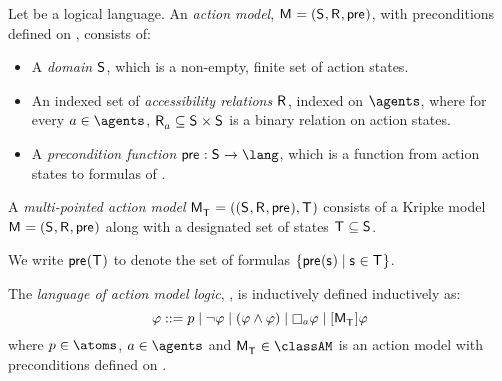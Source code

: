\begin{definition}
Let \lang{} be a logical language.
An {\em action model}, $\actionModelAndTuple$, with preconditions defined on \lang{}, consists of:
\begin{itemize}
    \item A {\em domain} $\actionStates$, which is a non-empty, finite set of action states.
    \item An indexed set of {\em accessibility relations} $\actionAccessibilityRel$, indexed on $\agents$, where for every $\agentA \in \agents$, $\actionAccessibility{\agentA} \subseteq \actionStates \times \actionStates$ is a binary relation on action states.
    \item A {\em precondition function} $\actionPrecondition : \actionStates \to \lang$, which is a function from action states to formulas of \lang{}.
\end{itemize}
A {\em multi-pointed action model} $\pointedActionModelAndTuple{\actionStatesT}$ consists of a Kripke model $\actionModelAndTuple$ along with a designated set of states $\actionStatesT \subseteq \actionStates$.
\end{definition}

We write $\actionPrecondition(\actionStatesT)$ to denote the set of formulas $\{\actionPrecondition(\actionStateS) \mid \actionStateS \in \actionStatesT\}$.

\begin{definition}
The {\em language of action model logic}, \langAml{}, is inductively defined inductively as:
$$
\phi ::= 
    \atomP \mid
    \lnot \phi \mid
    (\phi \land \phi) \mid
    \necessary[\agentA] \phi \mid
    \actionA{\pointedActionModel{\actionStatesT}} \phi
$$
where $\atomP \in \atoms$, $\agentA \in \agents$ and $\pointedActionModel{\actionStatesT} \in \classAM$ is an action model with preconditions defined on \langAml{}.
\end{definition}

